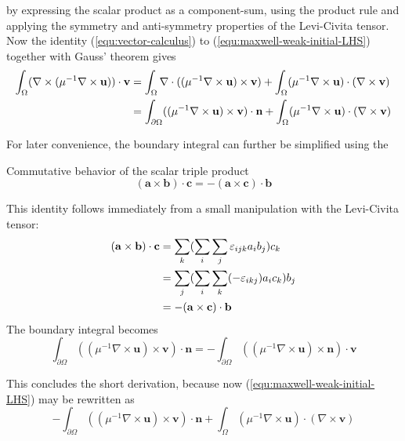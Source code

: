 \documentclass[11pt, a4paper]{article}
\begin{document}
by expressing the scalar product as a component-sum, using the product rule and
applying the symmetry and anti-symmetry properties of the Levi-Civita tensor.
Now the identity (\ref{equ:vector-calculus}) to (\ref{equ:maxwell-weak-initial-LHS})
together with Gauss' theorem gives
\begin{align}
    \int_{\Omega} (\nabla \times ({\mu^{-1} \nabla \times \mathbf{u}})) \cdot \mathbf{v} &=
    \int_{\Omega} \nabla \cdot (({\mu^{-1} \nabla \times \mathbf{u}}) \times \mathbf{v})
    + \int_{\Omega} ({\mu^{-1} \nabla \times \mathbf{u}}) \cdot (\nabla \times \mathbf{v}) \notag \\
    &= \int_{\partial \Omega} (({\mu^{-1} \nabla \times \mathbf{u}}) \times \mathbf{v}) \cdot \mathbf{n}
    + \int_{\Omega} ({\mu^{-1} \nabla \times \mathbf{u}}) \cdot (\nabla \times \mathbf{v}) \notag \\
\end{align}

For later convenience, the boundary integral can further be simplified using the
\begin{fancybox}{Commutative behavior of the scalar triple product}
    \begin{equation}
        (\mathbf{a} \times \mathbf{b}) \cdot \mathbf{c} = - (\mathbf{a} \times \mathbf{c}) \cdot \mathbf{b} \label{equ:vector-algebra}
    \end{equation}
\end{fancybox}
This identity follows immediately from a small manipulation with the Levi-Civita
tensor:
\begin{align}
    (\mathbf{a} \times \mathbf{b}) \cdot \mathbf{c} &= \sum_k (\sum_i \sum_j \varepsilon_{ijk} a_i b_j) c_k \notag \\
     &= \sum_j (\sum_i \sum_k (-\varepsilon_{ikj}) a_i c_k) b_j \notag \\ 
     &= - (\mathbf{a} \times \mathbf{c}) \cdot \mathbf{b} 
\end{align}
The boundary integral becomes 
\begin{equation}
    \int_{\partial \Omega} (({\mu^{-1} \nabla \times \mathbf{u}}) \times \mathbf{v}) \cdot \mathbf{n}
    = - \int_{\partial \Omega} (({\mu^{-1} \nabla \times \mathbf{u}}) \times \mathbf{n}) \cdot \mathbf{v}
\end{equation}

This concludes the short derivation, because now (\ref{equ:maxwell-weak-initial-LHS})
may be rewritten as
\begin{equation}
    - \int_{\partial \Omega} (({\mu^{-1} \nabla \times \mathbf{u}}) \times \mathbf{v}) \cdot \mathbf{n}
    + \int_{\Omega} ({\mu^{-1} \nabla \times \mathbf{u}}) \cdot (\nabla \times \mathbf{v})
\end{equation}
\end{document}
